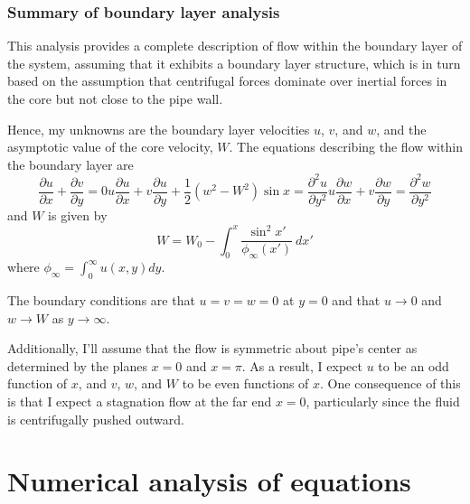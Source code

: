 \documentclass[10pt,a4paper]{report}
\begin{document}
\subsection{Summary of boundary layer analysis}

This analysis provides a complete description of flow within the boundary layer of the system, assuming that it exhibits a boundary layer structure, which is in turn based on the assumption that centrifugal forces dominate over inertial forces in the core but not close to the pipe wall.

Hence, my unknowns are the boundary layer velocities $u$, $v$, and $w$, and the asymptotic value of the core velocity, $W$. The equations describing the flow within the boundary layer are
\begin{subequations}
\begin{equation}
\frac{\partial u}{\partial x} + \frac{\partial v}{\partial y} = 0
\end{equation}
\begin{equation}
u \frac{\partial u}{\partial x} + v \frac{\partial u}{\partial y} + \frac{1}{2} \left(w^2 - W^2\right) \sin x = \frac{\partial^2 u}{\partial y^2}
\end{equation}
\begin{equation}
u \frac{\partial w}{\partial x} + v \frac{\partial w}{\partial y} = \frac{\partial ^2 w}{\partial y^2}
\end{equation}
\end{subequations}
and $W$ is given by
\begin{equation}
W = W_0 - \int_0^x \frac{\sin^2 x'}{\phi_\infty(x')} \ dx'
\end{equation}
where $\phi_\infty = \int_0^\infty u(x,y) dy$.

The boundary conditions are that $u = v = w = 0$ at $y = 0$ and that $u \rightarrow 0$ and $w \rightarrow W$ as $y \rightarrow \infty$.

Additionally, I'll assume that the flow is symmetric about pipe's center as determined by the planes $x = 0$ and $x = \pi$. As a result, I expect $u$ to be an odd function of $x$, and $v$, $w$, and $W$ to be even functions of $x$. One consequence of this is that I expect a stagnation flow at the far end $x = 0$, particularly since the fluid is centrifugally pushed outward.

\chapter{Numerical analysis of equations}
\end{document}
